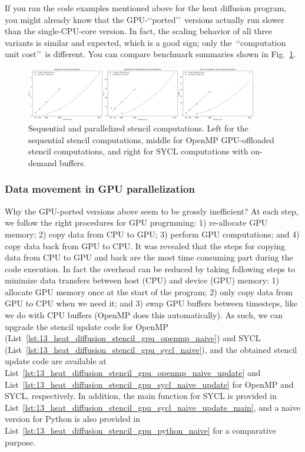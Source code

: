 \par
If you ran the code examples mentioned above for the heat diffusion program, you might already know that the GPU-\lq\lq ported\rq\rq~versions actually run slower than the single-CPU-core version.
In fact, the scaling behavior of all three variants is similar and expected, which is a good sign; only the~\lq\lq computation unit cost\rq\rq~is different.
You can compare benchmark summaries shown in Fig.~\ref{fig:heat_seq_openmp_sycl_naive}.


\begin{figure}[!htbp]
\centering\includegraphics[width=0.9\textwidth]{fig_problem/heat_seq_openmp_sycl_naive.png}
\caption{Sequential and parallelized stencil computations. Left for the sequential stencil computations, middle for OpenMP GPU-offloaded stencil computations, and right for SYCL computations with on-demand buffers.}\label{fig:heat_seq_openmp_sycl_naive}
\end{figure}


\subsubsection{Data movement in GPU parallelization}


\par
Why the GPU-ported versions above seem to be grossly inefficient? At each step, we follow the right procedures for GPU progrmming: 1) re-allocate GPU memory; 2) copy data from CPU to GPU; 3) perform GPU computations; and 4) copy data back from GPU to CPU.
It was revealed that the steps for copying data from CPU to GPU and back are the most time consuming part during the code execution.
In fact the overhead can be reduced by taking following steps to minimize data transfers between host (CPU) and device (GPU) memory: 1) allocate GPU memory once at the start of the program; 2) only copy data from GPU to CPU when we need it; and 3) swap GPU buffers between timesteps, like we do with CPU buffers (OpenMP does this automatically).
As such, we can upgrade the stencil update code for OpenMP (List~\ref{lst:13_heat_diffusion_stencil_gpu_openmp_naive}) and SYCL (List~\ref{lst:13_heat_diffusion_stencil_gpu_sycl_naive}), and the obtained stencil update code are available at List~\ref{lst:13_heat_diffusion_stencil_gpu_openmp_naive_update} and List~\ref{lst:13_heat_diffusion_stencil_gpu_sycl_naive_update} for OpenMP and SYCL, respectively.
In addition, the main function for SYCL is provided in List~\ref{lst:13_heat_diffusion_stencil_gpu_sycl_naive_update_main}, and a naive version for Python is also provided in List~\ref{lst:13_heat_diffusion_stencil_gpu_python_naive} for a comparative purpose.


